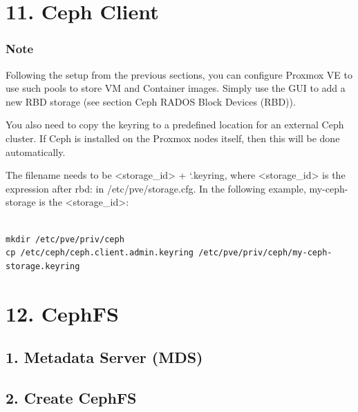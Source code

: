 \begin{table}[htbp]

\centering

\begin{tabular}

\end{tabular}

\end{table}


\section{11. Ceph Client}

\subsubsection{Note}

Following the setup from the previous sections, you can configure Proxmox VE to use such pools to store VM and Container images. Simply use the GUI to add a new RBD storage (see section Ceph RADOS Block Devices (RBD)).

You also need to copy the keyring to a predefined location for an external Ceph cluster. If Ceph is installed on the Proxmox nodes itself, then this will be done automatically.

The filename needs to be <storage_id> + `.keyring, where <storage_id> is the expression after rbd: in /etc/pve/storage.cfg. In the following example, my-ceph-storage is the <storage_id>:

\begin{lstlisting}

mkdir /etc/pve/priv/ceph
cp /etc/ceph/ceph.client.admin.keyring /etc/pve/priv/ceph/my-ceph-storage.keyring

\end{lstlisting}


\section{12. CephFS}

\subsection{1. Metadata Server (MDS)}

\subsection{2. Create CephFS}


